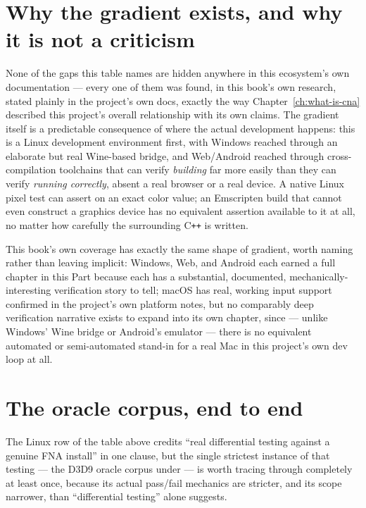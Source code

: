 \section{Why the gradient exists, and why it is not a criticism}

None of the gaps this table names are hidden anywhere in this ecosystem's own documentation
--- every one of them was found, in this book's own research, stated plainly in the project's
own docs, exactly the way Chapter~\ref{ch:what-is-cna} described this project's
overall relationship with its own claims. The gradient itself is a predictable consequence of
where the actual development happens: this is a Linux development environment first, with
Windows reached through an elaborate but real Wine-based bridge, and Web/Android reached
through cross-compilation toolchains that can verify \emph{building} far more easily than
they can verify \emph{running correctly}, absent a real browser or a real device. A native
Linux pixel test can assert on an exact color value; an Emscripten build that cannot even
construct a graphics device has no equivalent assertion available to it at all, no matter how
carefully the surrounding C\texttt{++} is written.

This book's own coverage has exactly the same shape of gradient, worth naming rather than
leaving implicit: Windows, Web, and Android each earned a full chapter in this Part because
each has a substantial, documented, mechanically-interesting verification story to tell; macOS
has real, working input support confirmed in the project's own platform notes, but no
comparably deep verification narrative exists to expand into its own chapter, since --- unlike
Windows' Wine bridge or Android's emulator --- there is no equivalent automated or
semi-automated stand-in for a real Mac in this project's own dev loop at all.

\section{The oracle corpus, end to end}

The Linux row of the table above credits ``real differential testing against a genuine FNA
install'' in one clause, but the single strictest instance of that testing --- the D3D9 oracle
corpus under  --- is worth tracing through completely at least once,
because its actual pass/fail mechanics are stricter, and its scope narrower, than ``differential
testing'' alone suggests.

